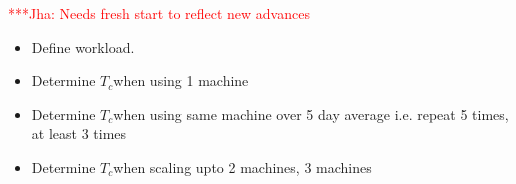 \documentclass[conference,final]{IEEEtran}
\newcommand{\tc}{$T_c$}
\newcommand{\jha}[0]{}
\newcommand{\jhanote}[1]{ {\textcolor{red} { ***Jha: #1 }}}
\begin{document}
\jhanote{Needs fresh start to reflect new advances}

\begin{itemize}
\item Define workload.
\item Determine  \tc when using 1 machine 
\item Determine \tc when using same machine over 5 day average i.e. repeat 5 times, at least 3 times
\item Determine \tc when scaling upto 2 machines, 3 machines 
\end{itemize}




\end{document}

